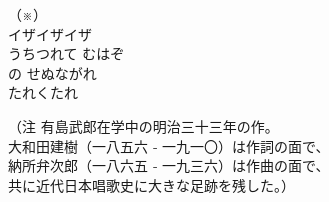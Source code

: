 \documentclass[10pt,b5j]{tarticle} %
\begin{document}
\begin{enumerate}
\begin{minipage}[c]{\blocksize}
    \end{minipage}
    \begin{minipage}[c]{0.5\hsize}

        \vspace{\linespace}
        \item[（※） ]~\\
        イザイザイザ\\
        うちつれて
        むはぞ\\
        の
        せぬながれ\\
        たれくたれ\\

    \end{minipage}
    \begin{minipage}[c]{0.5\hsize}

        \vspace{\linespace}
        （注 有島武郎在学中の明治三十三年の作。\\
        大和田建樹（一八五六 ‐ 一九一〇）は作詞の面で、\\
        納所弁次郎（一八六五 ‐ 一九三六）は作曲の面で、\\
        共に近代日本唱歌史に大きな足跡を残した。）

    \end{minipage}
\end{enumerate} %
\end{document}

